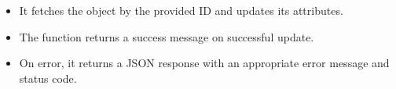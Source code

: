 \documentclass[letterpaper,10pt,english]{sphinxmanual}
\begin{document}
\begin{fulllineitems}
\begin{description}
\begin{itemize}
\item {} 
\sphinxAtStartPar
It fetches the  object by the provided ID and updates its attributes.

\item {} 
\sphinxAtStartPar
The function returns a success message on successful update.

\item {} 
\sphinxAtStartPar
On error, it returns a JSON response with an appropriate error message and status code.

\end{itemize}

\end{description}

\end{fulllineitems}

\end{document}

